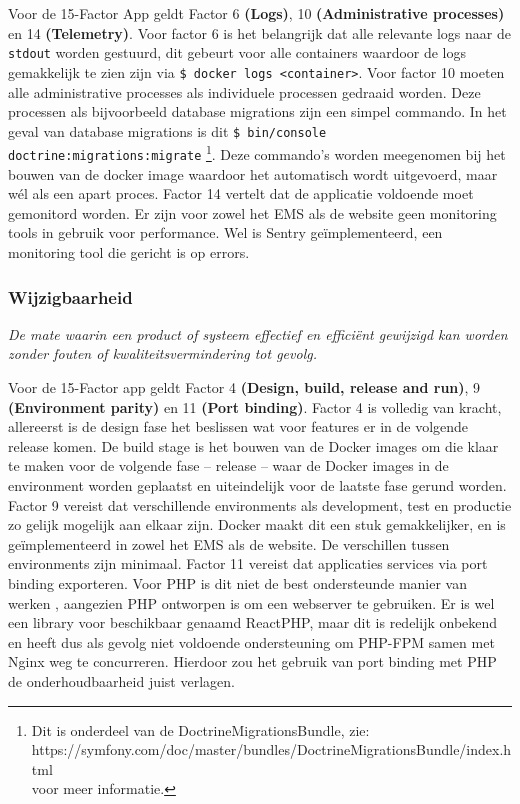 Voor de 15-Factor App geldt Factor 6 \textbf{(Logs)}, 10 \textbf{(Administrative processes)} en 14 \textbf{(Telemetry)}. Voor factor 6 is het belangrijk dat alle relevante logs naar de \texttt{stdout} worden gestuurd, dit gebeurt voor alle containers waardoor de logs gemakkelijk te zien zijn via \texttt{\$ docker logs <container>}. Voor factor 10 moeten alle administrative processes als individuele processen gedraaid worden. Deze processen als bijvoorbeeld database migrations zijn een simpel commando. In het geval van database migrations is dit \texttt{\$ bin/console doctrine:migrations:migrate} \footnote{Dit is onderdeel van de DoctrineMigrationsBundle, zie:\\ https://symfony.com/doc/master/bundles/DoctrineMigrationsBundle/index.html\\voor meer informatie.}. Deze commando's worden meegenomen bij het bouwen van de docker image waardoor het automatisch wordt uitgevoerd, maar wél als een apart proces. Factor 14 vertelt dat de applicatie voldoende moet gemonitord worden. Er zijn voor zowel het EMS als de website geen monitoring tools in gebruik voor performance. Wel is Sentry geïmplementeerd, een monitoring tool die gericht is op errors.

\subsubsection{Wijzigbaarheid}
\textit{De mate waarin een product of systeem effectief en efficiënt gewijzigd kan worden zonder fouten of kwaliteitsvermindering tot gevolg.}

Voor de 15-Factor app geldt Factor 4 \textbf{(Design, build, release and run)}, 9 \textbf{(Environment parity)} en 11 \textbf{(Port binding)}. Factor 4 is volledig van kracht, allereerst is de design fase het beslissen wat voor features er in de volgende release komen. De build stage is het bouwen van de Docker images om die klaar te maken voor de volgende fase -- release -- waar de Docker images in de environment worden geplaatst en uiteindelijk voor de laatste fase gerund worden. Factor 9 vereist dat verschillende environments als development, test en productie zo gelijk mogelijk aan elkaar zijn. Docker maakt dit een stuk gemakkelijker, en is geïmplementeerd in zowel het EMS als de website. De verschillen tussen environments zijn minimaal. Factor 11 vereist dat applicaties services via port binding exporteren. Voor PHP is dit niet de best ondersteunde manier van werken \parencite{PortBinding1, PortBinding2, PortBinding3}, aangezien PHP ontworpen is om een webserver te gebruiken. Er is wel een library voor beschikbaar genaamd ReactPHP, maar dit is redelijk onbekend en heeft dus als gevolg niet voldoende ondersteuning om PHP-FPM samen met Nginx weg te concurreren. Hierdoor zou het gebruik van port binding met PHP de onderhoudbaarheid juist verlagen.

